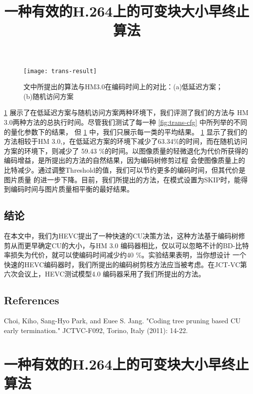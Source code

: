 \begin{figure}[H] %
  \centering
  \texttt{[image: trans-result]}
  \caption{文中所提出的算法与HM3.0在编码时间上的对比：(a)低延迟方案；(b)随机访问方案}
  \label{fig:trans-result}
\end{figure}

\ref{fig:trans-result} 展示了在低延迟方案与随机访问方案两种环境下，我们评测了我们的方法与
HM 3.0两种方法的总执行时间。尽管我们测试了每一种 \ref{fig:trans-cfg} 中所列举的不同的量化参数下的结果，
但 \ref{fig:trans-result} 中，我们只展示每一类的平均结果。 \ref{fig:trans-result} 显示了我们的
方法相较于HM 3.0,，在低延迟方案的环境下减少了63.34\%的时间，而在随机访问方案的环境下，则减少了
59.43 \%的时间。以图像质量的轻微退化为代价所获得的编码增益，是所提出的方法的自然结果，因为编码树修剪过程
会使图像质量上的比特减少。通过调整Threshold的值，我们可以节约更多的编码时间，但其代价是图片质量
的进一步下降。目前，我们所提出的方法，在模式设置为SKIP时，能得到编码时间与图片质量相平衡的最好结果。


\subsection{结论}

在本文中，我们为HEVC提出了一种快速的CU决策方法，这种方法基于编码树修剪从而更早确定CU的大小，与HM 3.0
编码器相比，仅以可以忽略不计的BD-比特率损失为代价，就可以使编码时间减少约40 \%。实验结果表明，当你想设计
一个快速的HEVC编码器时，我们所提出的编码树剪枝方法应当被考虑。在JCT-VC第六次会议上，HEVC测试模型4.0
编码器采用了我们所提出的方法。

\subsection*{References}

\begin{translationbib}
  \item Choi, Kiho, Sang-Hyo Park, and Euee S. Jang. "Coding tree pruning based CU early termination." 
  JCTVC-F092, Torino, Italy (2011): 14-22.
\end{translationbib}



\section{一种有效的H.264上的可变块大小早终止算法}

\title{一种有效的H.264上的可变块大小早终止算法}

